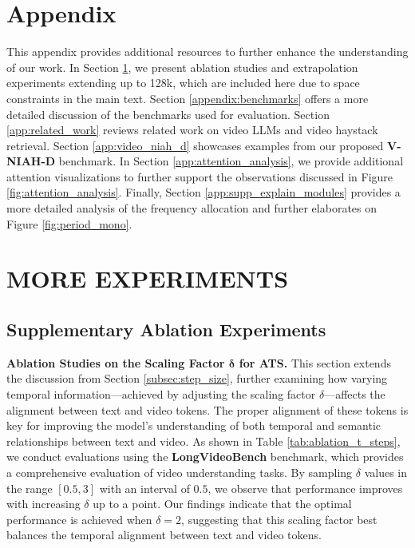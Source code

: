 \section*{\centering Appendix}

This appendix provides additional resources to further enhance the understanding of our work.
In Section \ref{app:MORE_EXPERIMENTS}, we present ablation studies and extrapolation experiments extending up to 128k, which are included here due to space constraints in the main text.
Section \ref{appendix:benchmarks} offers a more detailed discussion of the benchmarks used for evaluation.
Section \ref{app:related_work} reviews related work on video LLMs and video haystack retrieval.
Section \ref{app:video_niah_d} showcases examples from our proposed \textbf{V-NIAH-D} benchmark.
In Section \ref{app:attention_analysis}, we provide additional attention visualizations to further support the observations discussed in Figure \ref{fig:attention_analysis}.
Finally, Section \ref{app:supp_explain_modules} provides a more detailed analysis of the frequency allocation and further elaborates on Figure \ref{fig:period_mono}.

\section{MORE EXPERIMENTS} \label{app:MORE_EXPERIMENTS}
\subsection{Supplementary Ablation Experiments}\label{app:ablation_study}
\noindent \textbf{Ablation Studies on the Scaling Factor $\boldsymbol{\delta}$ for ATS.} \label{app:ATS}
This section extends the discussion from Section \ref{subsec:step_size}, further examining how varying temporal information—achieved by adjusting the scaling factor $\delta$—affects the alignment between text and video tokens. The proper alignment of these tokens is key for improving the model’s understanding of both temporal and semantic relationships between text and video. As shown in Table \ref{tab:ablation_t_steps}, we conduct evaluations using the \textbf{LongVideoBench} benchmark, which provides a comprehensive evaluation of video understanding tasks. By sampling $\delta$ values in the range $[0.5, 3]$ with an interval of $0.5$, we observe that performance improves with increasing $\delta$ up to a point. Our findings indicate that the optimal performance is achieved when $\delta = 2$, suggesting that this scaling factor best balances the temporal alignment between text and video tokens.

\setlength{\textfloatsep}{5pt}  %
\setlength{\intextsep}{5pt}     %
\setlength{\floatsep}{5pt}      %
\vspace{-5mm}
